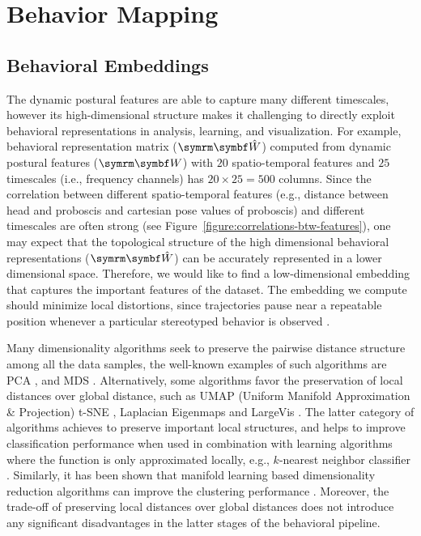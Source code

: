 \chapter{Behavior Mapping}

\section{Behavioral Embeddings}
The dynamic postural features are able to capture many different timescales, however its high-dimensional structure makes it challenging to directly exploit behavioral representations in analysis, learning, and visualization.
For example, behavioral representation matrix ($\V{\hat{W}}$) computed from dynamic postural features ($\V{W}$) with $20$ spatio-temporal features and $25$ timescales (i.e., frequency channels) has $20 \times 25 {=} 500$ columns.
Since the correlation between different spatio-temporal features (e.g., distance between head and proboscis and cartesian pose values of proboscis) and different timescales are often strong (see Figure~\ref{figure:correlations-btw-features}), one may expect that the topological structure of the high dimensional behavioral representations ($\V{\hat{W}}$) can be accurately represented in a lower dimensional space.
Therefore, we would like to find a low-dimensional embedding that captures the important features of the dataset.
The embedding we compute should minimize local distortions, since trajectories pause near a repeatable position whenever a particular stereotyped behavior is observed \citep{berman_mapping_2014, deangelis_manifold_2019, ali_timecluster_2019}.

Many dimensionality algorithms seek to preserve the pairwise distance structure among all the data samples, the well-known examples of such algorithms are PCA \citep{hotelling_analysis_1933}, and MDS \citep{kruskal_multidimensional_1964}.
Alternatively, some algorithms favor the preservation of local distances over global distance, such as UMAP (Uniform Manifold Approximation \& Projection) \citep{mcinnes_umap_2020} t-SNE \citep{maaten_visualizing_2008}, Laplacian Eigenmaps \citep{belkin_laplacian_2003} and LargeVis \citep{tang_visualizing_2016}.
The latter category of algorithms achieves to preserve important local structures, and helps to improve classification performance when used in combination with learning algorithms where the function is only approximated locally, e.g., $k$-nearest neighbor classifier \citep{mcinnes_umap_2020}.
Similarly, it has been shown that manifold learning based dimensionality reduction algorithms can improve the clustering performance \citep{sainburg_parametric_2021}.
Moreover, the trade-off of preserving local distances over global distances does not introduce any significant disadvantages in the latter stages of the behavioral pipeline.

